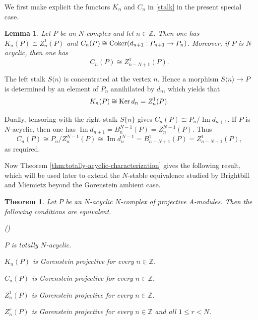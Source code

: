 \documentclass{amsart}
\theoremstyle{bfupright head,slanted body}
\theoremstyle{bfupright head,upright body}
\theoremstyle{fixed bf head,slanted body}
\newtheorem{thm}[res]{Theorem}          \newtheorem*{thm*}{Theorem}
\newtheorem{lem}[res]{Lemma}            \newtheorem*{lem*}{Lemma}
\theoremstyle{fixed bf head,upright body}
\theoremstyle{numbered paragraph}
\newlength{\thmlistleft}        %
\newlength{\thmlistright}       %
\newlength{\thmlistpartopsep}   %
\newlength{\thmlisttopsep}      %
\newlength{\thmlistparsep}      %
\newlength{\thmlistitemsep}     %
\newcounter{eqc}
\newenvironment{eqc}{\begin{list}{\upshape (\textit{\roman{eqc}})}%
		{\usecounter{eqc}%
			\setlength{\leftmargin}{\thmlistleft}%
			\setlength{\labelwidth}{\thmlistleft}%
			\setlength{\rightmargin}{\thmlistright}%
			\setlength{\partopsep}{\thmlistpartopsep}%
			\setlength{\topsep}{\thmlisttopsep}%
			\setlength{\parsep}{\thmlistparsep}%
			\setlength{\itemsep}{\thmlistitemsep}}}%
	{\end{list}}%
\newenvironment{prf*}[1][Proof]{%
	\begin{proof}[\bf #1]
		\setcounter{equation}{0}
		\renewcommand{\theequation}{\arabic{equation}}}
	{\end{proof}
}
\numberwithin{equation}{res}
\newcommand{\Ker}[1]{\nobreak{\operatorname{Ker}#1}}
\newcommand{\Coker}[1]{\nobreak{\operatorname{Coker}#1}}
\begin{document}
We first make explicit the functors $K_n$ and $C_n$ in \ref{stalk} in the present special case.

\begin{lem}\label{lem:N-stalks}
Let $P$ be an $N$-complex and let $n\in\mathbb Z$. Then one has $K_n(P)\cong Z_n^1(P)$
and $C_n(P)\cong\Coker(d_{n+1}: P_{n+1}\to P_n)$. Moreover, if $P$ is $N$-acyclic, then one has
$$C_n(P)\cong Z_{n-N+1}^1(P).$$
\end{lem}

\begin{prf*}
The left stalk $S\langle n\rangle$ is concentrated at the vertex $n$. Hence a morphism $S\langle n\rangle\to P$ is determined by an element of $P_n$ annihilated by $d_n$, which yields that $$K_n(P)\cong\Ker d_n=Z_n^1(P).$$ 

Dually, tensoring with the right stalk $S\{n\}$ gives $C_n(P)\cong P_n/\operatorname{Im}d_{n+1}$.
If $P$ is $N$-acyclic, then one has $\operatorname{Im}d_{n+1}=B_n^{N-1}(P)=Z_n^{N-1}(P)$. Thus
$$C_n(P)\cong P_n/Z_n^{N-1}(P) \cong\operatorname{Im}d_n^{\,N-1}
=B_{n-N+1}^{1}(P) =Z_{n-N+1}^{1}(P),$$
as required.
\end{prf*}

Now Theorem \ref{thm:totally-acyclic-characterization} gives the following result, which will be used later to extend the $N$-stable equivalence studied by Brightbill and Miemietz \cite{BM24} beyond the Gorenstein ambient case.

\begin{thm}\label{cor:N-cycles-GP}
Let $P$ be an $N$-acyclic $N$-complex of projective $A$-modules. Then the following conditions are equivalent.
\begin{eqc}
\item $P$ is totally $N$-acyclic.
\item $K_n(P)$ is Gorenstein projective for every $n\in\mathbb Z$.
\item $C_n(P)$ is Gorenstein projective for every $n\in\mathbb Z$.
\item $Z_n^1(P)$ is Gorenstein projective for every $n\in\mathbb Z$.
\item $Z_n^r(P)$ is Gorenstein projective for every $n\in\mathbb Z$ and all
$1\leq r<N$.
\end{eqc}
\end{thm}
\end{document}
